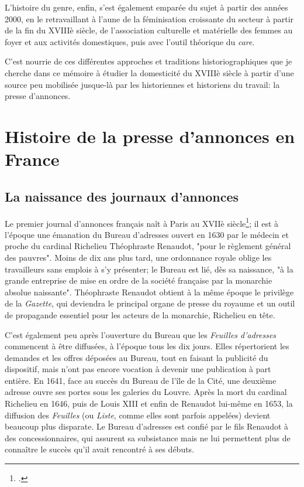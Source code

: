 L'histoire du genre, enfin, s'est également emparée du sujet à partir des années 2000, en le retravaillant à l'aune de la féminisation croissante du secteur à partir de la fin du XVIIIè siècle, de l'association culturelle et matérielle des femmes au foyer et aux activités domestiques, puis avec l'outil théorique du \textit{care}. 

C'est nourrie de ces différentes approches et traditions historiographiques que je cherche dans ce mémoire à étudier la domesticité du XVIIIè siècle à partir d'une source peu mobilisée jusque-là par les historiennes et historiens du travail: la presse d'annonces. 


\section{Histoire de la presse d'annonces en France}

\subsection{La naissance des journaux d'annonces}

Le premier journal d'annonces français naît à Paris au XVIIè siècle\footcite{martinTroisSieclesPublicite1992}; il est à l'époque une émanation du Bureau d'adresses ouvert en 1630 par le médecin et proche du cardinal Richelieu Théophraste Renaudot, "pour le règlement général des pauvres". Moins de dix ans plus tard, une ordonnance royale oblige les travailleurs sans emplois à s'y présenter; le Bureau est lié, dès sa naissance, "à la grande entreprise de mise en ordre de la société française par la monarchie absolue naissante". Théophraste Renaudot obtient à la même époque le privilège de la \textit{Gazette}, qui deviendra le principal organe de presse du royaume et un outil de propagande essentiel pour les acteurs de la monarchie, Richelieu en tête.

C'est également peu après l'ouverture du Bureau que les \textit{Feuilles d'adresses} commencent à être diffusées, à l'époque tous les dix jours. Elles répertorient les demandes et les offres déposées au Bureau, tout en faisant la publicité du dispositif, mais n'ont pas encore vocation à devenir une publication à part entière. En 1641, face au succès du Bureau de l'île de la Cité, une deuxième adresse ouvre ses portes sous les galeries du Louvre. Après la mort du cardinal Richelieu en 1646, puis de Louis XIII et enfin de Renaudot lui-même en 1653, la diffusion des\textit{ Feuilles} (ou \textit{Liste}, comme elles sont parfois appelées) devient beaucoup plus disparate. Le Bureau d'adresses est confié par le fils Renaudot à des concessionnaires, qui assurent sa subsistance mais ne lui permettent plus de connaître le succès qu'il avait rencontré à ses débuts.

